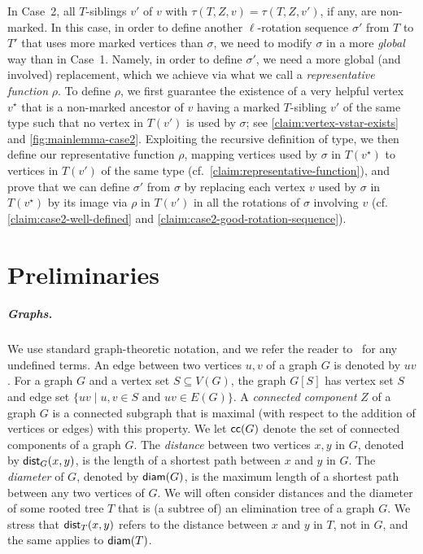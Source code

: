 \documentclass[a4paper,UKenglish,cleveref, autoref, thm-restate]{lipics-v2021}
\newcommand{\dist}{{\sf dist}\xspace}
\newcommand{\diam}{{\sf diam}\xspace}
\begin{document}
In Case~2, all $T$-siblings $v'$ of $v$ with $\tau(T,Z,v)=\tau(T,Z,v')$, if any, are non-marked.
In this case, in order to define another $\ell$-rotation sequence $\sigma'$ from $T$ to $T'$ that uses more marked vertices than $\sigma$, we need to modify $\sigma$ in a more {\sl global} way than in Case~1. Namely, in order to define $\sigma'$, we need a more global (and involved) replacement, which we achieve via what we call a \emph{representative function} $\rho$. To define $\rho$, we first guarantee the existence of a very helpful vertex $v^{\star}$ that is a non-marked ancestor of $v$ having a marked $T$-sibling $v'$ of the same type such that no vertex in $T(v')$ is used by $\sigma$; see \autoref{claim:vertex-vstar-exists} and \autoref{fig:mainlemma-case2}. Exploiting the recursive definition of type, we then define our representative function $\rho$, mapping vertices used by $\sigma$ in $T(v^{\star})$ to vertices in $T(v')$ of the same type (cf.~\autoref{claim:representative-function}), and prove that we can define $\sigma'$ from $\sigma$ by replacing each vertex $v$ used by $\sigma$ in $T(v^{\star})$ by its image via $\rho$ in $T(v')$ in all the rotations of $\sigma$ involving $v$ (cf. \autoref{claim:case2-well-defined} and
\autoref{claim:case2-good-rotation-sequence}).




\section{Preliminaries}\label{sec:prelim}

\subparagraph*{Graphs.} We use standard graph-theoretic notation, and we refer the reader to~\cite{Diestel16} for any undefined terms. An edge between two vertices $u,v$ of a graph $G$ is denoted by $uv$. For a graph $G$ and a vertex set $S \subseteq V(G)$, the graph $G[S]$ has vertex set $S$ and edge set $\{uv \mid u,v \in S \text{ and }uv \in E(G)\}$. A \emph{connected component} $Z$ of a graph $G$ is a connected subgraph that is maximal (with respect to the addition of vertices or edges) with this property. We let ${\sf cc}(G)$ denote the set of connected components of a graph $G$. The \emph{distance} between two vertices $x,y$ in $G$, denoted by $\dist_G(x,y)$, is the length of a shortest path between $x$ and $y$ in $G$. The \emph{diameter} of $G$, denoted by $\diam(G)$, is the maximum length of a shortest path between any two vertices of $G$. We will often consider distances and the diameter of some rooted tree $T$ that is (a subtree of) an elimination tree of a graph $G$. We stress that $\dist_T(x,y)$ refers to the distance between $x$ and $y$ in $T$, not in $G$, and the same applies to $\diam(T)$.
\end{document}
